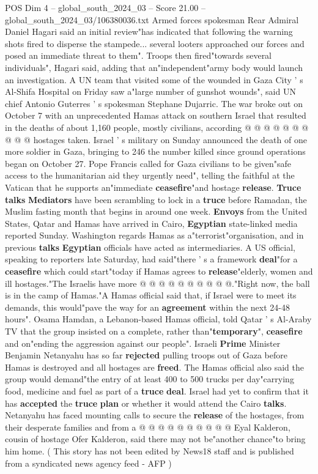 \begin{textsample}{POS Dim 4 – global\_south\_2024\_03 – Score 21.00 – global\_south\_2024\_03/106380036.txt}
Armed forces spokesman Rear Admiral Daniel Hagari said an initial review"has indicated that following the warning shots fired to disperse the stampede... several looters approached our forces and posed an immediate threat to them".
Troops then fired"towards several individuals", Hagari said, adding that an"independent"army body would launch an investigation.
A UN team that visited some of the wounded in Gaza City ' s Al-Shifa Hospital on Friday saw a"large number of gunshot wounds", said UN chief Antonio Guterres ' s spokesman Stephane Dujarric.
The war broke out on October 7 with an unprecedented Hamas attack on southern Israel that resulted in the deaths of about 1,160 people, mostly civilians, according @ @ @ @ @ @ @ @ @ @ hostages taken.
Israel ' s military on Sunday announced the death of one more soldier in Gaza, bringing to 246 the number killed since ground operations began on October 27.
Pope Francis called for Gaza civilians to be given"safe access to the humanitarian aid they urgently need", telling the faithful at the Vatican that he supports an"immediate \textbf{ceasefire}"and hostage \textbf{release}. \textbf{Truce} \textbf{talks} \textbf{Mediators} have been scrambling to lock in a \textbf{truce} before Ramadan, the Muslim fasting month that begins in around one week. \textbf{Envoys} from the United States, Qatar and Hamas have arrived in Cairo, \textbf{Egyptian} state-linked media reported Sunday.
Washington regards Hamas as a"terrorist"organisation, and in previous \textbf{talks} \textbf{Egyptian} officials have acted as intermediaries.
A US official, speaking to reporters late Saturday, had said"there ' s a framework \textbf{deal}"for a \textbf{ceasefire} which could start"today if Hamas agrees to \textbf{release}"elderly, women and ill hostages."The Israelis have more @ @ @ @ @ @ @ @ @ @."Right now, the ball is in the camp of Hamas."A Hamas official said that, if Israel were to meet its demands, this would"pave the way for an \textbf{agreement} within the next 24-48 hours".
Osama Hamdan, a Lebanon-based Hamas official, told Qatar ' s Al-Araby TV that the group insisted on a complete, rather than"\textbf{temporary}", \textbf{ceasefire} and on"ending the aggression against our people".
Israeli \textbf{Prime} Minister Benjamin Netanyahu has so far \textbf{rejected} pulling troops out of Gaza before Hamas is destroyed and all hostages are \textbf{freed}.
The Hamas official also said the group would demand"the entry of at least 400 to 500 trucks per day"carrying food, medicine and fuel as part of a \textbf{truce} \textbf{deal}.
Israel had yet to confirm that it has \textbf{accepted} the \textbf{truce} \textbf{plan} or whether it would attend the Cairo \textbf{talks}.
Netanyahu has faced mounting calls to secure the \textbf{release} of the hostages, from their desperate families and from a @ @ @ @ @ @ @ @ @ @ Eyal Kalderon, cousin of hostage Ofer Kalderon, said there may not be"another chance"to bring him home. ( This story has not been edited by News18 staff and is published from a syndicated news agency feed - AFP )


\end{textsample}
